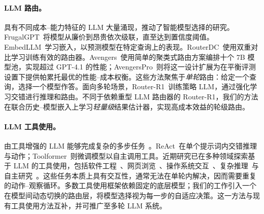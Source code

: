 \paragraph{LLM 路由。}
具有不同成本--能力特征的 LLM 大量涌现，推动了智能模型选择的研究。FrugalGPT~\citep{chen2023frugalgpt}将模型从廉价到昂贵依次级联，直至达到置信度阈值。EmbedLLM~\citep{wang2024embedllm}学习嵌入，以预测模型在特定查询上的表现。RouterDC~\citep{chen2024routerdc}使用双重对比学习训练有效的路由器。Avengers~\cite{zhang2025avengers}使用简单的聚类式路由方案编排十个 7B 模型池，实现超过 GPT-4.1 的性能；AvengersPro~\cite{zhang2025beyond}则将这一设计扩展为在平衡评测设置下提供帕累托最优的性能--成本权衡。这些方法聚焦于\emph{单轮}路由：给定一个查询，选择一个模型作答。面向多轮场景，Router-R1~\citep{zhang2025router}训练策略 LLM，通过强化学习交错进行推理和路由。不同于依赖重型 LLM 路由器的 Router-R1，我们的方法在联合历史--模型嵌入上学习\textit{轻量级}结果估计器，实现高成本效益的轮级路由。

\paragraph{LLM 工具使用。}
由工具增强的 LLM 能够完成复杂的多步任务~\citep{schick2023toolformer,qin2023toolllm}。ReAct~\citep{yao2023react}在单个提示词内交错推理与动作；Toolformer~\citep{schick2023toolformer}则微调模型以自主调用工具。近期研究已在多种领域探索基于 LLM 的工具使用，包括软件工程~\citep{jimenez2024swebench,yang2024sweagent}、网页浏览~\citep{zhou2024webarena}、操作系统交互~\citep{xie2024osworld}、复杂推理~\citep{mialon2023gaiabenchmarkgeneralai}与自主研究~\citep{team2025tongyi}。这些任务本质上具有交互性，通常无法在单轮内解决，因而需要重复的动作--观察循环。多数工具使用框架依赖固定的底层模型；我们的工作引入一个在模型间动态切换的路由层，将模型选择视为每一步的自适应决策。这一方法与现有工具使用方法互补，并可推广至多轮 LLM 系统。
